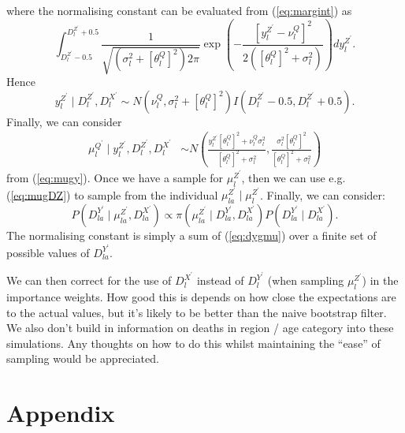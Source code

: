 \documentclass[a4paper]{article}
\begin{document}
where the normalising constant can be evaluated from (\ref{eq:margint}) as
\begin{equation*}
    \int_{D^{Z^\prime}_l - 0.5}^{D^{Z^\prime}_l + 0.5} \frac{1}{\sqrt{\left(\sigma^2_l + \left[\theta^Q_l\right]^2\right)2\pi}} \exp\left(-\frac{\left[y^{Z^\prime}_l - \nu^Q_l\right]^2}{2\left(\left[\theta^Q_l\right]^2 + \sigma^2_l\right)}\right)dy^{Z^\prime}_l.
\end{equation*}
Hence 
\begin{equation}
    y^{Z^\prime}_l \mid D^{Z^\prime}_l, D^{X^\prime}_l \sim N\left(\nu^Q_l, \sigma^2_l + \left[\theta^Q_l\right]^2\right)I\left(D^{Z^\prime}_l - 0.5, D^{Z^\prime}_l + 0.5\right).
\end{equation}
Finally, we can consider
\begin{align}
    \mu^{Q^\prime}_l \mid y^{Z^\prime}_l, D^{Z^\prime}_l, D^{X^\prime}_l &\sim N\left(\frac{y^{Z^\prime}_l\left[\theta^Q_l\right]^2 + \nu^Q_l\sigma^2_l}{\left[\theta^Q_l\right]^2 + \sigma^2_l}, \frac{\sigma^2_l \left[\theta^Q_l\right]^2}{\left[\theta^Q_l\right]^2 + \sigma^2_l}\right)
\end{align}
from (\ref{eq:mugy}).
Once we have a sample for $\mu^{Z^\prime}_l$, then we can use e.g. (\ref{eq:mugDZ}) to sample from the individual $\mu^{Z^\prime}_{la} \mid \mu^{Z^\prime}_l$. Finally, we can consider:
\begin{equation}
    P\left(D^{Y^\prime}_{la} \mid \mu^{Z^\prime}_{la}, D^{X^\prime}_{la}\right) \propto \pi\left(\mu^{Z^\prime}_{la} \mid D^{Y^\prime}_{la}, D^{X^\prime}_{la}\right)P\left(D^{Y^\prime}_{la} \mid D^{X^\prime}_{la}\right). \label{eq:dygmu}
\end{equation}
The normalising constant is simply a sum of (\ref{eq:dygmu}) over a finite set of possible values of $D^{Y^\prime}_{la}$.

We can then correct for the use of $D^{X^\prime}_l$ instead of $D^{Y^\prime}_l$ (when sampling $\mu^{Z^\prime}_l$) in the importance weights. How good this is depends on how close the expectations are to the actual values, but it's likely to be better than the naive bootstrap filter. We also don't build in information on deaths in region / age category into these simulations. Any thoughts on how to do this whilst maintaining the ``ease'' of sampling would be appreciated.

\section{Appendix}
\end{document}
